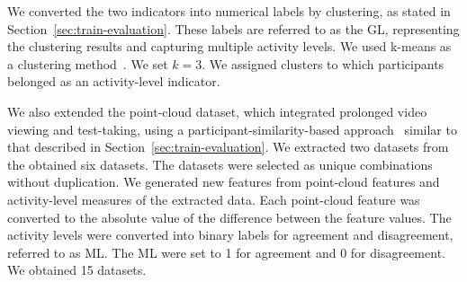 \begin{deletedblock}
We converted the two indicators into numerical labels by clustering, as stated in Section~\ref{sec:train-evaluation}.
These labels are referred to as the GL, representing the clustering results and capturing multiple activity levels.
We used k-means as a clustering method~\cite{krishna1999genetic}.
We set $k=3$.
We assigned clusters to which participants belonged as an activity-level indicator.

We also extended the point-cloud dataset, which integrated prolonged video viewing and test-taking, using a participant-similarity-based approach~\cite{shinkuma2019relational} similar to that described in Section~\ref{sec:train-evaluation}.
We extracted two datasets from the obtained six datasets.
The datasets were selected as unique combinations without duplication.
We generated new features from point-cloud features and activity-level measures of the extracted data.
Each point-cloud feature was converted to the absolute value of the difference between the feature values.
The activity levels were converted into binary labels for agreement and disagreement, referred to as ML.
The ML were set to 1 for agreement and 0 for disagreement.
We obtained 15 datasets.
\end{deletedblock}
